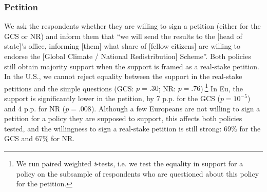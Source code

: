 \begin{table}[h]
  \caption[List experiment: tacit support for the GCS]{Number of supported policies in the list experiment depending on the presence of the Global Climate Scheme (GCS) in the list.%
  }\label{tab:list_exp}
  \makebox[\textwidth][c]{
  }
\end{table}

\subsubsection{Petition}\label{subsubsec:petition} %
We ask the respondents whether they are willing to sign a petition (either for the GCS or NR) and inform them that ``we will send the results to the [head of state]'s office, informing [them] what share of [fellow citizens] are willing to endorse the [Global Climate / National Redistribution] Scheme''. Both policies still obtain majority support when the support is framed as a real-stake petition. In the U.S., we cannot reject equality between the support in the real-stake petitions and the simple questions (GCS: $p=.30$; NR: $p=.76$).\footnote{We run paired weighted \textit{t}-tests, i.e. we test the equality in support for a policy on the subsample of respondents who are questioned about this policy for the petition.} In Eu, the support is significantly lower in the petition, by 7 p.p. for the GCS ($p=10^{-5}$) and 4 p.p. for NR ($p=.008$). Although a few Europeans are not willing to sign a petition for a policy they are supposed to support, this affects both policies tested, and the willingness to sign a real-stake petition is still strong: 69\% for the GCS and 67\% for NR.

